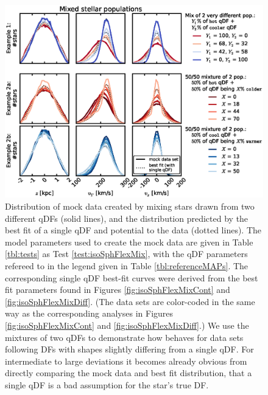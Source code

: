\begin{figure}[!htbp]
\centering
\includegraphics[width=\columnwidth]{figs/isoSphFlexMix_mockdata_residuals_2.eps}
\caption{Distribution of mock data created by mixing stars drawn from two different qDFs (solid lines), and the distribution predicted by the best fit of a single qDF and potential to the data (dotted lines). The model parameters used to create the mock data are given in Table \ref{tbl:tests} as Test \ref{test:isoSphFlexMix}, with the qDF parameters refereed to in the legend given in Table \ref{tbl:referenceMAPs}. The corresponding single qDF best-fit curves were derived from the best fit parameters found in Figures \ref{fig:isoSphFlexMixCont} and \ref{fig:isoSphFlexMixDiff}. (The data sets are color-coded in the same way as the corresponding analyses in Figures  \ref{fig:isoSphFlexMixCont} and \ref{fig:isoSphFlexMixDiff}.) We use the mixtures of two qDFs to demonstrate how \RM{} behaves for data sets following DFs with shapes slightly differing from a single qDF. For intermediate to large deviations it becomes already obvious from directly comparing the mock data and best fit distribution, that a single qDF is a bad assumption for the star's true DF. }
\label{fig:isoSphFlexMix_mockdata_residuals}
\end{figure}



